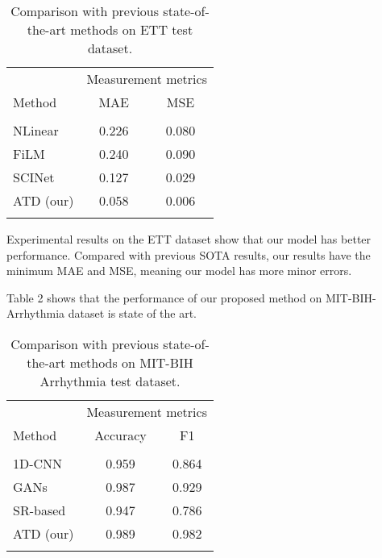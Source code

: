 \documentclass{ecai}
\begin{document}
\begin{table}
\begin{center}
{\caption{Comparison with previous state-of-the-art methods
on ETT test dataset.}\label{table1}}
\begin{tabular}{lcc}
\hline
\rule{0pt}{12pt}
&\multicolumn{2}{c}{Measurement metrics}\\
\cline{2-3}
\rule{0pt}{12pt}
Method &MAE &MSE
\\
\hline
\\[-6pt]
\quad NLinear\cite{zeng2022transformers} & 0.226 & 0.080\\
\quad FiLM\cite{zhou2022film} & 0.240 & 0.090\\

\quad SCINet\cite{liu2022scinet} & 0.127 & 0.029\\

\quad ATD (our)  & 0.058  & 0.006\\
\hline
\\[-6pt]

\end{tabular}
\end{center}
\end{table}

Experimental results on the ETT dataset show that our model has better performance. Compared with previous SOTA results, our results have the minimum MAE and MSE, meaning our model has more minor errors.



Table 2 shows that the performance of our proposed method on MIT-BIH-Arrhythmia dataset is state of the art.


\begin{table}
\begin{center}
{\caption{Comparison with previous state-of-the-art methods
on MIT-BIH Arrhythmia test dataset. }\label{table2}}
\begin{tabular}{lcc}
\hline
\rule{0pt}{12pt}
&\multicolumn{2}{c}{Measurement metrics}\\
\cline{2-3}
\rule{0pt}{12pt}
Method&Accuracy&F1
\\
\hline
\\[-6pt]
\quad 1D-CNN\cite{kiranyaz2015real}  &0.959 & 0.864   \\
\quad GANs\cite{shaker2020generalization}  &0.987 & 0.929  \\
\quad SR-based\cite{yamacc2022personalized}  &0.947   & 0.786  \\

\quad ATD (our)  &0.989 & 0.982  \\
\hline
\\[-6pt]

\end{tabular}
\end{center}
\end{table}
\end{document}
